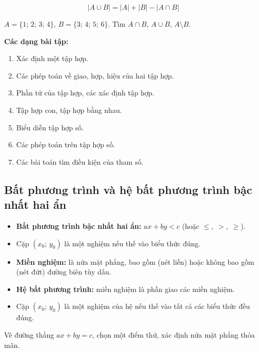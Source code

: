 \documentclass[12pt,a4paper]{article}
\begin{document}
\begin{congthuc}[title={Công thức đếm}]
  \[
    |A \cup B| = |A| + |B| - |A \cap B|
  \]
\end{congthuc}

\begin{vidu}
  $A = \{1;\, 2;\, 3;\, 4\}$, $B = \{3;\, 4;\, 5;\, 6\}$. Tìm $A \cap B$, $A \cup B$, $A \setminus B$.
\end{vidu}

\medskip\noindent\textbf{Các dạng bài tập:}
\begin{enumerate}[label=\textbf{Dạng \arabic*:}, leftmargin=*, align=left]
  \item Xác định một tập hợp.
  \item Các phép toán về giao, hợp, hiệu của hai tập hợp.
  \item Phần tử của tập hợp, các xác định tập hợp.
  \item Tập hợp con, tập hợp bằng nhau.
  \item Biểu diễn tập hợp số.
  \item Các phép toán trên tập hợp số.
  \item Các bài toán tìm điều kiện của tham số.
\end{enumerate}

\subsection{Bất phương trình và hệ bất phương trình bậc nhất hai ẩn}

\begin{dinhnghia}
  \begin{itemize}
    \item \textbf{Bất phương trình bậc nhất hai ẩn:} $ax + by < c$ (hoặc $\le,\; >,\; \ge$).
    \item Cặp $(x_0;\, y_0)$ là một nghiệm nếu thế vào biểu thức đúng.
    \item \textbf{Miền nghiệm:} là nửa mặt phẳng, bao gồm (nét liền) hoặc không bao gồm (nét đứt) đường biên tùy dấu.
    \item \textbf{Hệ bất phương trình:} miền nghiệm là phần giao các miền nghiệm.
    \item Cặp $(x_0;\, y_0)$ là một nghiệm của hệ nếu thế vào tất cả các biểu thức đều đúng.
  \end{itemize}
\end{dinhnghia}

\begin{phuongphap}[title={Xác định miền nghiệm}]
  Vẽ đường thẳng $ax + by = c$, chọn một điểm thử, xác định nửa mặt phẳng thỏa mãn.
\end{phuongphap}
\end{document}
